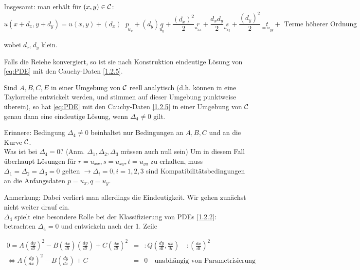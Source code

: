 \underline{Insgesamt:} man erhält für $(x,y) \in \mathcal{C}$:
\begin{equation}%
    u\left( x+d_x, y+d_y \right) = u(x,y) + (d_x) \underset{=u_x}{p} + (d_y)\underset{u_y}{q} + \frac{(d_x)^2}{2} \underset{u_{xx}}{r} + \frac{d_x d_y}{2} \underset{u_{xy}}{s} + \frac{(d_y)^2}{2} \underset{=u_{yy}}{t} + \text{ Terme höherer Ordnung}
    \label{}
\end{equation}

wobei $d_x, d_y$ klein. 

Falls die Reiehe konvergiert, so ist sie nach Konstruktion eindeutige Lösung von \eqref{eq:PDE} mit den Cauchy-Daten \ref{1.2.5}.

\begin{satz}
    Sind $A,B,C,E$ in einer Umgebung von $\mathcal{C}$ reell analytisch (d.h. können in eine Taylorreihe entwickelt werden, und stimmen auf dieser Umgebung punktweise überein), so hat \eqref{eq:PDE} mit den Cauchy-Daten \ref{1.2.5} in einer Umgebung von $\mathcal{C}$ genau dann eine eindeutige Lösung, wenn $\Delta_4 \neq 0$ gilt.
    
\end{satz}

Erinnere: Bedingung $\Delta_4 \neq 0$ beinhaltet nur Bedingungen an $A,B,C$ und an die Kurve $\mathcal{C}$.\\
Was ist bei $\Delta_4 = 0$? (Anm. $\Delta_1, \Delta_2, \Delta_3$ müssen auch null sein)
Um in diesem Fall überhaupt Lösungen für $r=u_{xx}, s=u_{xy}, t=u_{yy}$ zu erhalten, muss $\Delta_1 = \Delta_2 = \Delta_3 = 0$ gelten $\to \Delta_i = 0, i=1,2,3$ sind Kompatibilitätsbedingungen an die Anfangsdaten $p=u_x, q=u_y$. 

Anmerkung: Dabei verliert man allerdings die Eindeutigkeit. Wir gehen zunächst nicht weiter drauf ein.\\

$\Delta_4$ spielt eine besondere Rolle bei der Klassifizierung von PDEs \ref{1.2.2}:\\
betrachten $\Delta_4 = 0$ und entwickeln nach der 1. Zeile

\begin{eqnarray} %

    0 = A \left( \frac{dy}{dl} \right)^2 - B \left( \frac{dx}{dl} \right) \left( \frac{dy}{dl} \right) + C \left( \frac{dx}{dl} \right)^2 &=&: Q\left( \frac{dy}{dl}, \frac{dx}{dl} \right) \quad :\left( \frac{dx}{dl} \right)^2\\
    \Leftrightarrow A \left( \frac{dy}{dx} \right)^2 - B \left( \frac{dy}{dx} \right) + C &=&  0 \quad \text{unabhängig von Parametrisierung}
    \label{eq:Bed}
\end{eqnarray}

